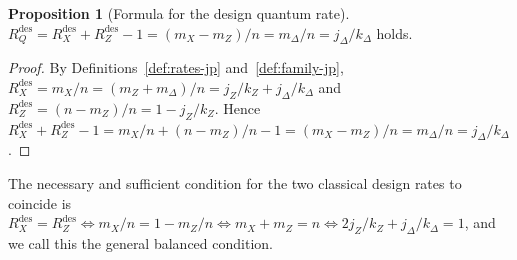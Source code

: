 \documentclass[11pt]{article}
\theoremstyle{definition}
\newtheorem{proposition}[theorem]{Proposition}
\begin{document}
\begin{proposition}[Formula for the design quantum rate]\label{prop:design-qrate-jp}
\(R_Q^{\mathrm{des}}=R_X^{\mathrm{des}}+R_Z^{\mathrm{des}}-1=(m_X-m_Z)/n=m_\Delta/n=j_\Delta/k_\Delta\) holds.
\end{proposition}

\begin{proof}
By Definitions~\ref{def:rates-jp} and~\ref{def:family-jp}, \(R_X^{\mathrm{des}}=m_X/n=(m_Z+m_\Delta)/n=j_Z/k_Z+j_\Delta/k_\Delta\) and \(R_Z^{\mathrm{des}}=(n-m_Z)/n=1-j_Z/k_Z\). Hence \(R_X^{\mathrm{des}}+R_Z^{\mathrm{des}}-1=m_X/n+(n-m_Z)/n-1=(m_X-m_Z)/n=m_\Delta/n=j_\Delta/k_\Delta\).
\end{proof}

The necessary and sufficient condition for the two classical design rates to coincide is \(R_X^{\mathrm{des}}=R_Z^{\mathrm{des}}\iff m_X/n=1-m_Z/n\iff m_X+m_Z=n\iff 2j_Z/k_Z+j_\Delta/k_\Delta=1\), and we call this the general balanced condition.
\end{document}
